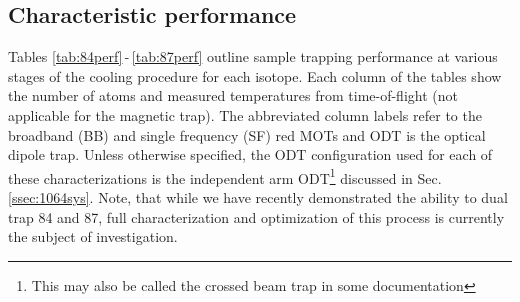 \subsection{Characteristic performance} \label{sec:benchmark_trapping}
Tables \ref{tab:84perf}\,-\,\ref{tab:87perf} outline sample trapping performance at various stages of the cooling procedure for each isotope.
Each column of the tables show the number of atoms and measured temperatures from time-of-flight (not applicable for the magnetic trap). 
The abbreviated column labels refer to the broadband (BB) and single frequency (SF) red MOTs and ODT is the optical dipole trap. 
Unless otherwise specified, the ODT configuration used for each of these characterizations is the independent arm ODT\footnote{This may also be called the crossed beam trap in some documentation} discussed in Sec.\,\ref{ssec:1064sys}.
Note, that while we have recently demonstrated the ability to dual trap 84 and 87, full characterization and optimization of this process is currently the subject of investigation.

